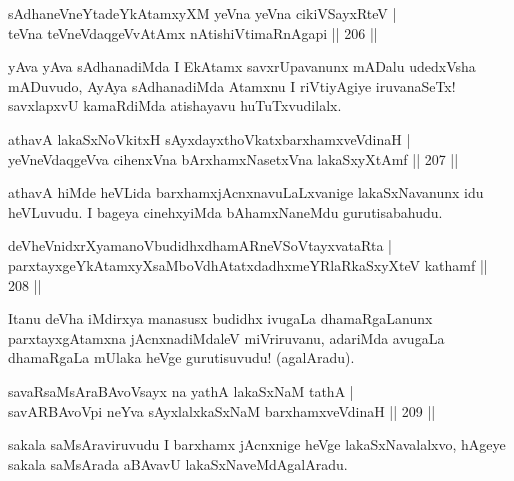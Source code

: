 
\begin{shl}
sAdhaneVneYtadeYkAtamxyXM yeVna yeVna cikiVSayxRteV |\\
teVna teVneVdaqgeVvA\s \s tAmx nAtishiVtimaRnAgapi \hfill || 206 ||
\end{shl}

\begin{artha}
yAva yAva sAdhanadiMda I EkAtamx savxrUpavanunx mADalu udedxVsha mADuvudo, AyAya sAdhanadiMda Atamxnu I riVtiyAgiye iruvanaSeTx! savxlapxvU kamaRdiMda atishayavu huTuTxvudilalx.
\end{artha}

\begin{shl}
athavA lakaSxNoVkitxH sAyxdayxthoVkatxbarxhamxveVdinaH |\\
yeVneVdaqgeVva cihenxVna bArxhamxNasetxVna lakaSxyXtAmf \hfill || 207 ||
\end{shl}

\begin{artha}%
athavA hiMde heVLida barxhamxjAcnxnavuLaLxvanige lakaSxNavanunx idu heVLuvudu. I bageya cinehxyiMda bAhamxNaneMdu gurutisabahudu.
\end{artha}

\begin{shl}
deVheVnidxrXyamanoVbudidhxdhamARneVSoV\s tayxvataRta |\\
parxtayxgeYkAtamxyXsaMboVdhAtatxdadhxmeYRlaRkaSxyXteV kathamf \hfill || 208 ||
\end{shl}

\begin{artha}
Itanu deVha iMdirxya manasusx budidhx ivugaLa dhamaRgaLanunx parxtayxgAtamxna jAcnxnadiMdaleV miVriruvanu, adariMda avugaLa dhamaRgaLa mUlaka heVge gurutisuvudu! (agalAradu).
\end{artha}

\begin{shl}
savaRsaMsAraBAvoV\s sayx na yathA lakaSxNaM tathA |\\
savARBAvoV\s pi neYva sAyxlalxkaSxNaM barxhamxveVdinaH \hfill || 209 ||
\end{shl}

\begin{artha}
sakala saMsAraviruvudu I barxhamx jAcnxnige heVge lakaSxNavalalxvo, hAgeye sakala saMsArada aBAvavU lakaSxNaveMdAgalAradu.
\end{artha}


